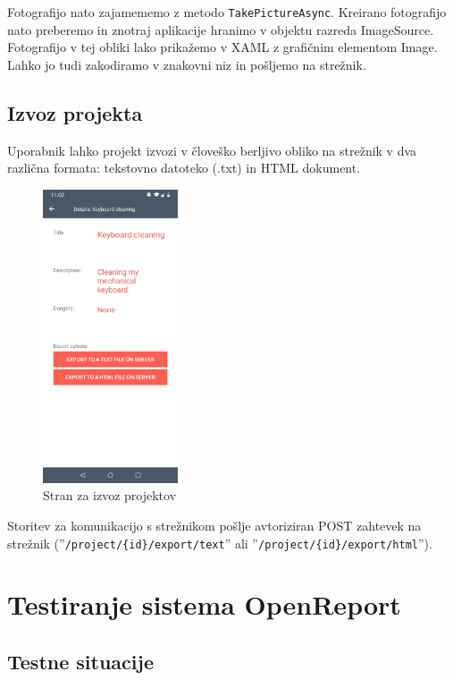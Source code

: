 \documentclass[a4paper, 12pt]{book}
\begin{document}
Fotografijo nato zajamememo z metodo \texttt{TakePictureAsync}.
Kreirano fotografijo nato preberemo in znotraj aplikacije hranimo v objektu razreda ImageSource.
Fotografijo v tej obliki lako prikažemo v XAML z grafičnim elementom Image.
Lahko jo tudi zakodiramo v znakovni niz in pošljemo na strežnik.


\subsection{Izvoz projekta}

Uporabnik lahko projekt izvozi v človeško berljivo obliko na strežnik v dva različna formata: tekstovno datoteko (.txt) in HTML dokument.

\begin{figure}[H]
\begin{center}
	\includegraphics[width=4cm]{app_project_export}
\end{center}
	\caption{Stran za izvoz projektov}
\label{app_note}
\end{figure}

Storitev za komunikacijo s strežnikom pošlje avtoriziran POST zahtevek na strežnik (''\texttt{/project/\{id\}/export/text}'' ali ''\texttt{/project/\{id\}/export/html}'').

\section{Testiranje sistema OpenReport}

\subsection{Testne situacije}
\end{document}

